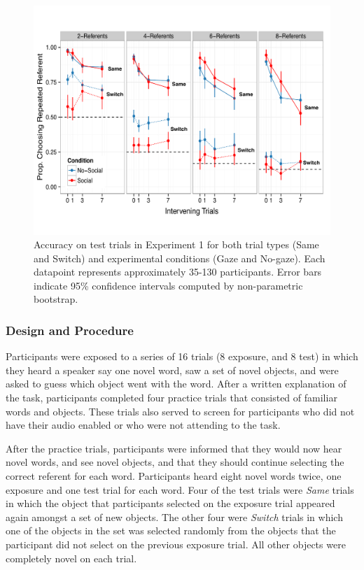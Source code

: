 \documentclass[10pt,letterpaper]{article}
\begin{document}
\begin{figure}[t!]
\begin{center}
\includegraphics[scale=0.5]{plots_figs/acc-test-expt1}
\end{center}
\caption{Accuracy on test trials in Experiment 1 for both trial types (Same and Switch) and 
experimental conditions (Gaze and No-gaze). Each datapoint represents 
approximately 35-130 participants. Error bars indicate 95\% confidence intervals 
computed by non-parametric bootstrap.}
\end{figure}

\subsubsection{Design and Procedure}

Participants were exposed to a series of 16 trials (8 exposure, and 8 test) 
in which they heard a speaker say one novel word, saw a set of novel objects, and were asked 
to guess which object went with the word. After a written explanation of the task, participants 
completed four practice trials that consisted of familiar words and objects. These trials also 
served to screen for participants who did not have their audio enabled or who were not attending 
to the task.

After the practice trials, participants were informed that they would now hear
novel words, and see novel objects, and that they should continue selecting the correct
referent for each word. Participants heard eight novel words twice, one exposure and one test trial for each word. 
Four of the test trials were \textit{Same} trials in which the object that participants selected on the exposure trial 
appeared again amongst a set of new objects. The other four were \textit{Switch} trials in which one of the objects 
in the set was selected randomly from the objects that the participant did not select on the previous exposure trial. 
All other objects were completely novel on each trial. 
\end{document}
